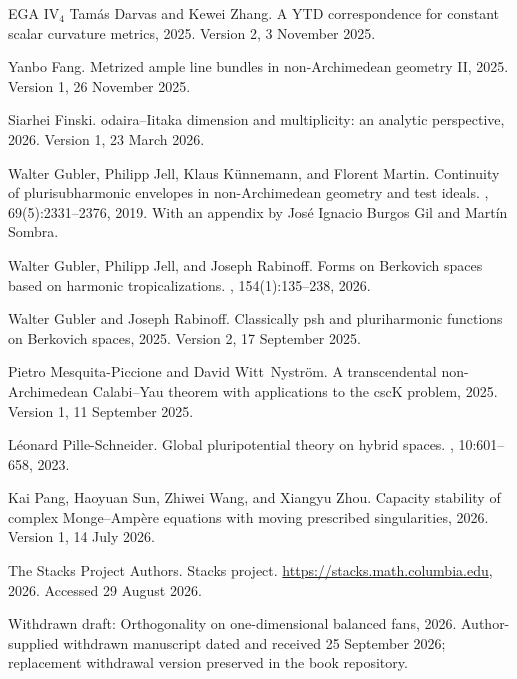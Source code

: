 \documentclass[11pt,a4paper]{article}
\theoremstyle{definition}
\theoremstyle{remark}
\begin{document}
\begin{thebibliography}{EGA IV$_4$}
Tam\'as Darvas and Kewei Zhang.
\newblock A {YTD} correspondence for constant scalar curvature metrics, 2025.
\newblock Version 2, 3 November 2025.

Yanbo Fang.
\newblock Metrized ample line bundles in non-{A}rchimedean geometry {II}, 2025.
\newblock Version 1, 26 November 2025.

Siarhei Finski.
odaira--{I}itaka dimension and multiplicity: an analytic
  perspective, 2026.
\newblock Version 1, 23 March 2026.

Walter Gubler, Philipp Jell, Klaus K{\"u}nnemann, and Florent Martin.
\newblock Continuity of plurisubharmonic envelopes in non-{A}rchimedean
  geometry and test ideals.
, 69(5):2331--2376, 2019.
\newblock With an appendix by Jos{\'e} Ignacio Burgos Gil and Mart{\'i}n
  Sombra.

Walter Gubler, Philipp Jell, and Joseph Rabinoff.
\newblock Forms on {B}erkovich spaces based on harmonic tropicalizations.
, 154(1):135--238, 2026.

Walter Gubler and Joseph Rabinoff.
\newblock Classically psh and pluriharmonic functions on {B}erkovich spaces,
  2025.
\newblock Version 2, 17 September 2025.

Pietro Mesquita-Piccione and David Witt~Nyström.
\newblock A transcendental non-{A}rchimedean {C}alabi--{Y}au theorem with
  applications to the csc{K} problem, 2025.
\newblock Version 1, 11 September 2025.

L{\'e}onard Pille-Schneider.
\newblock Global pluripotential theory on hybrid spaces.
, 10:601--658, 2023.

Kai Pang, Haoyuan Sun, Zhiwei Wang, and Xiangyu Zhou.
\newblock Capacity stability of complex {M}onge--{A}mp\`ere equations with
  moving prescribed singularities, 2026.
\newblock Version 1, 14 July 2026.

The {Stacks Project Authors}.
\newblock Stacks project.
\newblock \url{https://stacks.math.columbia.edu}, 2026.
\newblock Accessed 29 August 2026.

Withdrawn draft: Orthogonality on one-dimensional balanced fans, 2026.
\newblock Author-supplied withdrawn manuscript dated and received 25 September
  2026; replacement withdrawal version preserved in the book repository.


\end{thebibliography}
\end{document}
